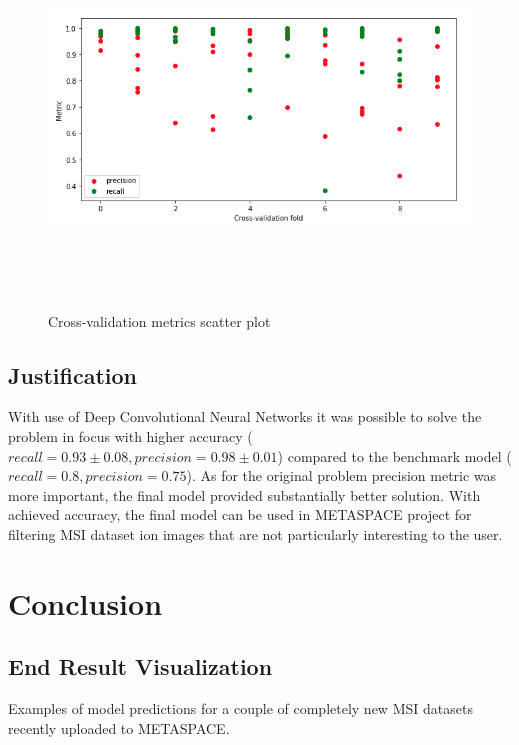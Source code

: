 \documentclass[a4paper]{article}
\begin{document}
\begin{figure}[H]
    \centering
        \includegraphics[width=\textwidth,height=10cm,keepaspectratio]{cross-validation_scatter_plot.png}
    \caption{Cross-validation metrics scatter plot}
\end{figure}

\subsection*{Justification}

With use of Deep Convolutional Neural Networks it was possible to solve the problem in focus with higher accuracy
($recall=0.93\pm0.08, precision=0.98\pm0.01$) compared to the benchmark model ($recall=0.8, precision=0.75$).
As for the original problem precision metric was more important, the final model provided substantially better solution.
With achieved accuracy, the final model can be used in METASPACE project for filtering MSI dataset ion images
that are not particularly interesting to the user.

\pagebreak
\section*{Conclusion}

\subsection*{End Result Visualization}

Examples of model predictions for a couple of completely new MSI datasets recently uploaded to METASPACE.
\end{document}
